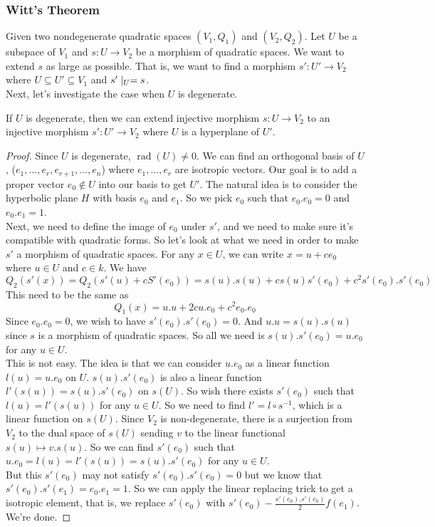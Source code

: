 \documentclass[15pt]{scrartcl}
\newcommand{\rad}{\operatorname{rad}}
\begin{document}
\subsubsection*{Witt's Theorem}
Given two nondegenerate quadratic spaces $(V_1,Q_1)$ and $(V_2,Q_2)$. Let $U$ be a subspace of $V_1$ and $s: U\to V_2$ be a morphism of quadratic spaces. We want to extend $s$ as large as possible. That is, we want to find a morphism $s': U' \to V_2$ where $U\subseteq U'\subseteq V_1$ and $s'\mid_{U}=s$. 
\\
Next, let's investigate the case when $U$ is degenerate. 
\begin{lemma}
    If $U$ is degenerate, then we can extend injective morphism $s: U\to V_2$ to an injective morphism $s': U' \to V_2$ where $U$ is a hyperplane of $U'$. 
\end{lemma}
\begin{proof}
    Since $U$ is degenerate, $\rad(U)\neq 0$. We can find an orthogonal basis of $U$, ($e_1, \ldots, e_r, e_{r+1}, \ldots, e_n$) where $e_{1}, \ldots, e_r$ are isotropic vectors. Our goal is to add a proper vector $e_0\notin U$ into our basis to get $U'$. The natural idea is to consider the hyperbolic plane $H$ with basis $e_0$ and $e_1$. So we pick $e_0$ such that $e_0.e_0=0$ and $e_0.e_1=1$. 
    \\

    Next, we need to define the image of $e_0$ under $s'$, and we need to make sure it's compatible with quadratic forms. So let's look at what we need in order to make $s'$ a morphism of quadratic spaces. For any $x\in U$, we can write $x=u+ce_0$ where $u\in U$ and $c\in k$. We have 
    \[Q_2(s'(x))=Q_2(s'(u)+cS'(e_0))=s(u).s(u)+cs(u)s'(e_0)+c^2s'(e_0).s'(e_0)\]
    This need to be the same as 
    \[Q_1(x)=u.u+2cu.e_0+c^2e_0.e_0\]
    Since $e_0.e_0=0$, we wish to have $s'(e_0).s'(e_0)=0$. And $u.u=s(u).s(u)$ since $s$ is a morphism of quadratic spaces. So all we need is $s(u).s'(e_0)=u.e_0$ for any $u\in U$. 
    \\

    This is not easy. The idea is that we can consider $u.e_0$ as a linear function $l(u)=u.e_0$ on $U$. $s(u).s'(e_0)$ is also a linear function $l'(s(u))=s(u).s'(e_0)$ on $s(U)$. So wish there exists $s'(e_0)$ such that $l(u)=l'(s(u))$ for any $u\in U$. So we need to find $l'=l\circ s^{-1}$, which is a linear function on $s(U)$. Since $V_2$ is non-degenerate, there is a surjection from $V_2$ to the dual space of $s(U)$ sending $v$ to the linear functional $s(u)\mapsto v.s(u)$. So we can find $s'(e_0)$ such that $u.e_0=l(u)=l'(s(u))=s(u).s'(e_0)$ for any $u\in U$. 
    \\

    But this $s'(e_0)$ may not satisfy $s'(e_0).s'(e_0)=0$ but we know that $s'(e_0).s'(e_1)=e_0.e_1=1$. So we can apply the linear replacing trick to get a isotropic element, that is, we replace $s'(e_0)$ with $s'(e_0)-\frac{s'(e_0).s'(e_0)}{2}f(e_1)$. We're done. 
\end{proof}
\end{document}
